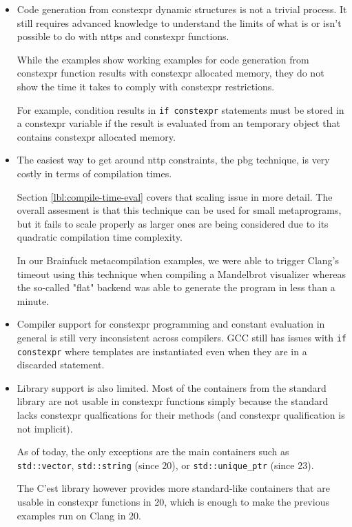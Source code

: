 \documentclass[../main]{subfiles}
\begin{document}
\begin{itemize}

\item
Code generation from \gls{constexpr} dynamic structures is not a trivial process.
It still requires advanced \cpp knowledge to understand the limits of what
is or isn't possible to do with \glspl{nttp} and \gls{constexpr} functions.

While the examples show working examples for code generation from \gls{constexpr}
function results with \gls{constexpr} allocated memory, they do not show the time
it takes to comply with \cpp \gls{constexpr} restrictions.

For example, condition results in \lstinline{if constexpr} statements must be
stored in a \gls{constexpr} variable if the result is evaluated from an temporary
object that contains \gls{constexpr} allocated memory.

\item
The easiest way to get around \gls{nttp} constraints, \ie the \gls{pbg}
technique, is very costly in terms of compilation times.

Section \ref{lbl:compile-time-eval} covers that scaling issue in more detail.
The overall assesment is that this technique can be used for small metaprograms,
but it fails to scale properly as larger ones are being considered
due to its quadratic compilation time complexity.

In our Brainfuck metacompilation examples, we were able to trigger Clang's
timeout using this technique when compiling a Mandelbrot visualizer
whereas the so-called "flat" backend was able to generate the program in less
than a minute.

\item
Compiler support for \gls{constexpr} programming and constant evaluation in general
is still very inconsistent across compilers. GCC still has issues with
\lstinline{if constexpr} where templates are instantiated even when they are
in a discarded statement.

\item
Library support is also limited.
Most of the containers from the \cpp standard library are not usable in
\gls{constexpr} functions simply because the \cpp standard lacks \gls{constexpr}
qualfications for their methods (and \gls{constexpr} qualification is not implicit).

As of today, the only exceptions are the main containers such as
\lstinline{std::vector}, \lstinline{std::string} (since \cpp{}20),
or \lstinline{std::unique_ptr} (since \cpp{}23).

The C'est \cite{cest} library however provides more standard-like containers
that are usable in \gls{constexpr} functions in \cpp{}20, which is enough to make
the previous examples run on Clang in \cpp{}20.

\end{itemize}
\end{document}

